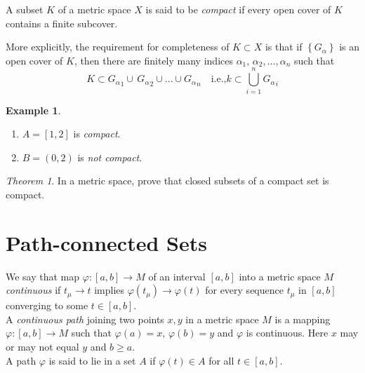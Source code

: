 \documentclass[12pt,oneside,a4paper]{book}
\newcommand{\xn}[2]{{#1}_1{#2}\,{#1}_2{#2}\dots{#2}{#1}_n}
\newcommand{\set}[1]{\left\{#1\right\}}
\theoremstyle{remark}
\newtheorem{thm}{Theorem}[section]
\theoremstyle{definition}
\newtheorem*{ex}{Example}
\begin{document}
A subset $ K $ of a metric space $ X $ is said to be \emph{compact} if every open cover of $ K $ contains a finite subcover.

More explicitly, the requirement for completeness of $ K\subset X $ is that if $ \set{G_\alpha} $ is an open cover of $ K $, then there are finitely many indices $ \xn{\alpha}{,} $ such that
\[K\subset \xn{G_\alpha}{\cup}\quad \text{i.e.,}k\subset \bigcup_{i=1}^n {G_\alpha}_i\]
\begin{ex}
    \hfill
    \begin{enumerate}
        \item $ A=[1, 2] $ is \emph{compact}.
        \item $ B=(0, 2) $ is \emph{not compact}.
    \end{enumerate}
\end{ex}
\begin{thm}
    In a metric space, prove that closed subsets of a compact set is compact.
\end{thm}
\section{Path-connected Sets}
We say that map $ \varphi: [a,b]\to M $ of an interval $ [a,b] $ into a metric space $ M $ \emph{continuous} if $ t_\mu\to t $ implies $ \varphi(t_\mu)\to\varphi(t) $ for every sequence $ t_\mu $ in $ [a,b] $ converging to some $ t\in[a,b] $.\\

A \emph{continuous path} joining two points $ x,y $ in a metric space $ M $ is a mapping $ \varphi: [a,b]\to M $ such that $ \varphi(a)=x,\, \varphi(b)=y $ and $ \varphi $ is continuous. Here $ x $ may or may not equal $ y $ and $ b\geq a $.
\\

A path $ \varphi $ is said to lie in a set $ A $ if $ \varphi(t)\in A $ for all $ t\in [a,b] $.
\\
\end{document}
